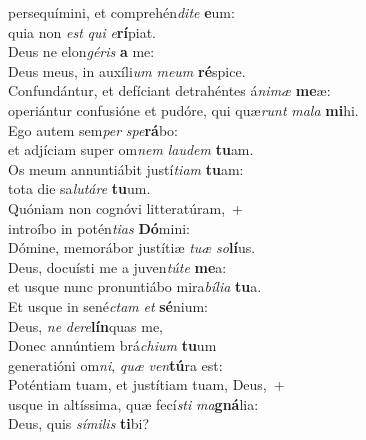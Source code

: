 \evenverse  persequímini, et comprehén\textit{di}\textit{te} \textbf{e}um:~\*\\
\evenverse quia non \textit{est} \textit{qui} \textit{e}\textbf{rí}piat.\\
\oddverse Deus ne elon\textit{gé}\textit{ris} \textbf{a} me:~\*\\
\oddverse Deus meus, in auxíli\textit{um} \textit{me}\textit{um} \textbf{ré}spice.\\
\evenverse Confundántur, et defíciant detrahéntes á\textit{ni}\textit{mæ} \textbf{me}æ:~\*\\
\evenverse operiántur confusióne et pudóre, qui quæ\textit{runt} \textit{ma}\textit{la} \textbf{mi}hi.\\
\oddverse Ego autem sem\textit{per} \textit{spe}\textbf{rá}bo:~\*\\
\oddverse et adjíciam super om\textit{nem} \textit{lau}\textit{dem} \textbf{tu}am.\\
\evenverse Os meum annuntiábit justí\textit{ti}\textit{am} \textbf{tu}am:~\*\\
\evenverse tota die sa\textit{lu}\textit{tá}\textit{re} \textbf{tu}um.\\
\oddverse Quóniam non cognóvi litteratúram,~+\\
\oddverse  introíbo in potén\textit{ti}\textit{as} \textbf{Dó}mini:~\*\\
\oddverse Dómine, memorábor justítiæ \textit{tu}\textit{æ} \textit{so}\textbf{lí}us.\\
\evenverse Deus, docuísti me a juven\textit{tú}\textit{te} \textbf{me}a:~\*\\
\evenverse et usque nunc pronuntiábo mira\textit{bí}\textit{li}\textit{a} \textbf{tu}a.\\
\oddverse Et usque in sené\textit{ctam} \textit{et} \textbf{sé}nium:~\*\\
\oddverse Deus, \textit{ne} \textit{de}\textit{re}\textbf{lín}quas me,\\
\evenverse Donec annúntiem brá\textit{chi}\textit{um} \textbf{tu}um~\*\\
\evenverse generatióni om\textit{ni}, \textit{quæ} \textit{ven}\textbf{tú}ra est:\\
\oddverse Poténtiam tuam, et justítiam tuam, Deus,~+\\
\oddverse  usque in altíssima, quæ fecí\textit{sti} \textit{ma}\textbf{gná}lia:~\*\\
\oddverse Deus, quis \textit{sí}\textit{mi}\textit{lis} \textbf{ti}bi?\\
